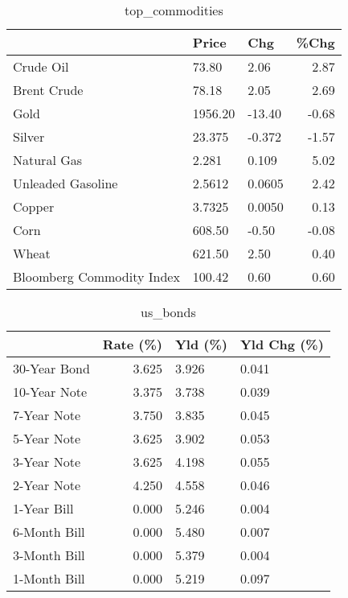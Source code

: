 \documentclass{article}%
\begin{document}
\begin{table}[htbp]%
\caption{top\_commodities}%
\centering%
\begin{adjustbox}{width=1\textwidth}%
\begin{tabular}{lllr}
\toprule
                          &   Price &    Chg &  \%Chg \\
\midrule
               Crude Oil  &   73.80 &   2.06 &  2.87 \\
             Brent Crude  &   78.18 &   2.05 &  2.69 \\
                    Gold  & 1956.20 & -13.40 & -0.68 \\
                  Silver  &  23.375 & -0.372 & -1.57 \\
             Natural Gas  &   2.281 &  0.109 &  5.02 \\
       Unleaded Gasoline  &  2.5612 & 0.0605 &  2.42 \\
                  Copper  &  3.7325 & 0.0050 &  0.13 \\
                    Corn  &  608.50 &  -0.50 & -0.08 \\
                   Wheat  &  621.50 &   2.50 &  0.40 \\
Bloomberg Commodity Index &  100.42 &   0.60 &  0.60 \\
\bottomrule
\end{tabular}
%
\end{adjustbox}%
\end{table}

%


\begin{table}[htbp]%
\caption{us\_bonds}%
\centering%
\begin{adjustbox}{width=1\textwidth}%
\begin{tabular}{lrll}
\toprule
             &  Rate (\%) & Yld (\%) & Yld Chg (\%) \\
\midrule
30-Year Bond &     3.625 &   3.926 &       0.041 \\
10-Year Note &     3.375 &   3.738 &       0.039 \\
 7-Year Note &     3.750 &   3.835 &       0.045 \\
 5-Year Note &     3.625 &   3.902 &       0.053 \\
 3-Year Note &     3.625 &   4.198 &       0.055 \\
 2-Year Note &     4.250 &   4.558 &       0.046 \\
 1-Year Bill &     0.000 &   5.246 &       0.004 \\
6-Month Bill &     0.000 &   5.480 &       0.007 \\
3-Month Bill &     0.000 &   5.379 &       0.004 \\
1-Month Bill &     0.000 &   5.219 &       0.097 \\
\bottomrule
\end{tabular}
%
\end{adjustbox}%
\end{table}
\end{document}

